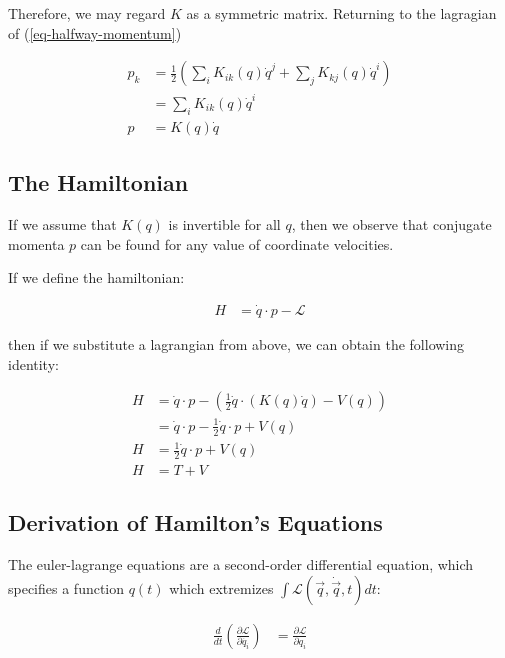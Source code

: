 \documentclass{article}
\begin{document}
Therefore, we may regard $K$ as a symmetric matrix.
Returning to the lagragian of (\ref{eq-halfway-momentum})

\begin{align}
	p_k & = \frac12 \left( \sum_i K_{i k} (q) \dot{q}^j 
		+ \sum_j K_{k j} (q) \dot{q}^i \right) \nonumber \\
	& = \sum_i K_{i k}(q) \dot{q}^i \label{eq-def-of-pk}\\
	p & = K(q) \dot{q} \label{eq-def-of-p}
\end{align}

\subsection{The Hamiltonian}

If we assume that $K(q)$ is invertible for all $q$, then we observe that
	conjugate momenta $p$ can be found for any value of coordinate velocities.

If we define the hamiltonian:

\begin{align}
	H & = \dot{q} \cdot p - \mathcal{L} \label{eq-def-of-H}
\end{align}

then if we substitute a lagrangian from above, we can obtain the following
	identity:

\begin{align}
	H & = \dot{q} \cdot p - 
	\left( \frac 1 2 \dot{q} \cdot \left( K(q) \dot{q} \right)  - V(q) \right)
	\nonumber \\
	& = \dot{q} \cdot p - 
	\frac 1 2 \dot{q} \cdot p  + V(q) \nonumber \\
	H & = \frac 12 \dot{q} \cdot p + V(q) \nonumber \\
	H & = T + V \label{eq-H-is-energy}
\end{align}

\subsection{Derivation of Hamilton's Equations}

The euler-lagrange equations are a second-order differential equation, which 
	specifies a function $q(t)$ which extremizes $\int \mathcal{L}(\vec{q}, \dot{\vec{q}}, t) dt$:

\begin{align}
	\frac d {dt} \left( \frac {\partial \mathcal{L}}{\partial \dot{q_i}} \right)
	& = \frac {\partial \mathcal{L}} {\partial q_i} \label{eq-euler-lagrange}
\end{align}
\end{document}
